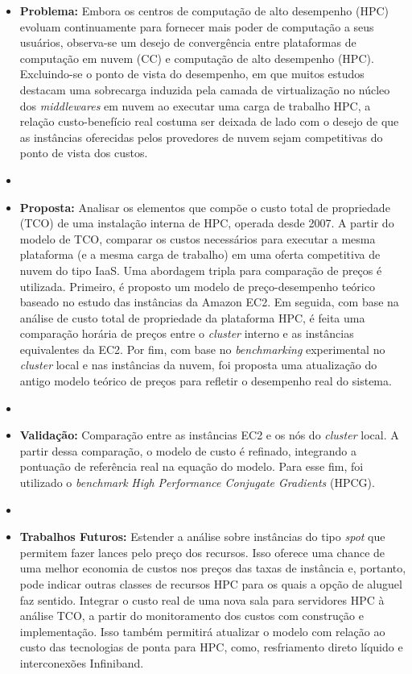 \documentclass[tese,capa]{texufpel}
\begin{document}
\begin{itemize}[label={},noitemsep]
  \item \textbf{Problema:} Embora os centros de computação de alto desempenho (HPC) evoluam continuamente para fornecer mais poder de computação a seus usuários, observa-se um desejo de convergência entre plataformas de computação em nuvem (CC) e computação de alto desempenho (HPC). Excluindo-se o ponto de vista do desempenho, em que muitos estudos destacam uma sobrecarga induzida pela camada de virtualização no núcleo dos \textit{middlewares} em nuvem ao executar uma carga de trabalho HPC, a relação custo-benefício real costuma ser deixada de lado com o desejo de que as instâncias oferecidas pelos provedores de nuvem sejam  competitivas do ponto de vista dos custos. 
  \item 
  \item \textbf{Proposta:} Analisar os elementos que compõe o custo total de propriedade (TCO) de uma instalação interna de HPC, operada desde 2007. A partir do modelo de TCO, comparar os custos necessários para executar a mesma plataforma (e a mesma carga de trabalho) em uma oferta competitiva de nuvem do tipo IaaS. Uma abordagem tripla para comparação de preços é utilizada. Primeiro, é proposto um modelo de preço-desempenho teórico baseado no estudo das instâncias da Amazon EC2. Em seguida, com base na análise de custo total de propriedade da plataforma HPC, é feita uma comparação horária de preços entre o \textit{cluster} interno e as instâncias equivalentes da EC2. Por fim, com base no \textit{benchmarking} experimental no \textit{cluster} local e nas instâncias da nuvem, foi proposta uma atualização do antigo modelo teórico de preços para refletir o desempenho real do sistema.
  \item 
  \item \textbf{Validação:} Comparação entre as instâncias EC2 e os nós do \textit{cluster} local. A partir dessa comparação, o modelo de custo é refinado, integrando a pontuação de referência real na equação do modelo. Para esse fim, foi utilizado o \textit{benchmark} \textit{High Performance Conjugate Gradients} (HPCG).
  \item 
  \item \textbf{Trabalhos Futuros:} Estender a análise sobre instâncias do tipo \textit{spot} que permitem fazer lances pelo preço dos recursos. Isso oferece uma chance de uma melhor economia de custos nos preços das taxas de instância e, portanto, pode indicar outras classes de recursos HPC para os quais a opção de aluguel faz sentido. Integrar o custo real de uma nova sala para servidores HPC à análise TCO, a partir do monitoramento dos custos com construção e implementação. Isso também permitirá atualizar o modelo com relação ao custo das tecnologias de ponta para HPC, como, resfriamento direto líquido e interconexões Infiniband.
  
\end{itemize}
\end{document}
